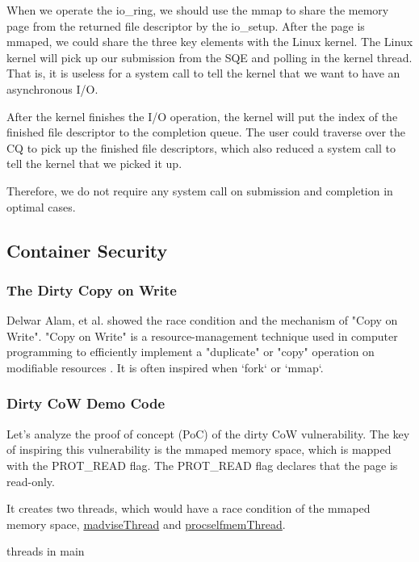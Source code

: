 \documentclass[12pt,a4paper]{article}
\begin{document}
When we operate the io\_ring, we should use the mmap to share the memory page from
the returned file descriptor by the io\_setup. After the page is mmaped, we could share
the three key elements with the Linux kernel. The Linux kernel will pick up our submission
from the SQE and polling in the kernel thread. That is, it is useless for a system call
to tell the kernel that we want to have an asynchronous I/O.

After the kernel finishes the I/O operation, the kernel will put the index of the finished
file descriptor to the completion queue. The user could traverse over the CQ to pick up
the finished file descriptors, which also reduced a system call to tell the kernel that
we picked it up.

Therefore, we do not require any system call on submission and completion in optimal cases.

\subsection{Container Security}
\hypertarget{security}{}
\subsubsection{The Dirty Copy on Write}
Delwar Alam, et al. \cite{Study_Dirty_Cow} showed the race condition and the mechanism of
"Copy on Write". "Copy on Write" is a resource-management technique used in
computer programming to efficiently implement a "duplicate" or "copy" operation
on modifiable resources \cite{CoW_wiki}. It is often inspired when `fork` or `mmap`.

\subsubsection{Dirty CoW Demo Code}
Let's analyze the proof of concept (PoC) of the dirty CoW \cite{Dirty_CoW} vulnerability.
The key of inspiring this vulnerability is the mmaped memory space, which is mapped with
the PROT\_READ flag. The PROT\_READ flag declares that the page is read-only.


It creates two threads, which would have a race condition of the mmaped memory space,
\hyperlink{madvise}{madviseThread} and \hyperlink{procself}{procselfmemThread}.

\hypertarget{threads_main}{threads in main}

\end{document}

